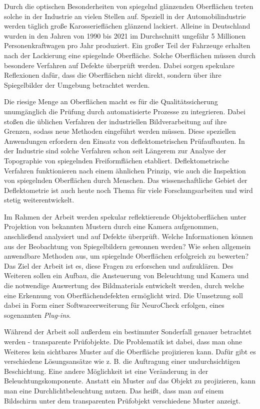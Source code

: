 Durch die optischen Besonderheiten von spiegelnd glänzenden Oberflächen treten solche in der Industrie an vielen Stellen auf.
Speziell in der Automobilindustrie werden täglich große Karosserieflächen glänzend lackiert.
Alleine in Deutschland wurden in den Jahren von 1990 bis 2021 im Durchschnitt ungefähr 5 Millionen Personenkraftwagen pro Jahr produziert. \cite{statistaPKW}
Ein großer Teil der Fahrzeuge erhalten nach der Lackierung eine spiegelnde Oberfläche.
Solche Oberflächen müssen durch besondere Verfahren auf Defekte überprüft werden.
Dabei sorgen spekulare Reflexionen dafür, dass die Oberflächen nicht direkt, sondern über ihre Spiegelbilder der Umgebung betrachtet werden. %

\p
Die riesige Menge an Oberflächen macht es für die Qualitätssicherung unumgänglich die Prüfung durch automatisierte Prozesse zu integrieren.
Dabei stoßen die üblichen Verfahren der industriellen Bildverarbeitung auf ihre Grenzen, sodass neue Methoden eingeführt werden müssen.
Diese speziellen Anwendungen erfordern den Einsatz von deflektometrischen Prüfaufbauten.
In der Industrie sind solche Verfahren schon seit Längerem zur Analyse der Topographie von spiegelnden Freiformflächen etabliert.
Deflektometrische Verfahren funktionieren nach einem ähnlichen Prinzip, wie auch die Inspektion von spiegelnden Oberflächen durch Menschen.
Das wissenschaftliche Gebiet der Deflektometrie ist auch heute noch Thema für viele Forschungsarbeiten und wird stetig weiterentwickelt.

\p
Im Rahmen der Arbeit werden spekular reflektierende Objektoberflächen unter Projektion von bekannten Mustern durch eine Kamera aufgenommen, anschließend analysiert und auf Defekte überprüft.
Welche Informationen können aus der Beobachtung von Spiegelbildern gewonnen werden?
Wie sehen allgemein anwendbare Methoden aus, um spiegelnde Oberflächen erfolgreich zu bewerten?
Das Ziel der Arbeit ist es, diese Fragen zu erforschen und aufzuklären.
Des Weiteren sollen ein Aufbau, die Ansteuerung von Beleuchtung und Kamera und die notwendige Auswertung des Bildmaterials entwickelt werden, durch welche eine Erkennung von Oberflächendefekten ermöglicht wird.
Die Umsetzung soll dabei in Form einer Softwareerweiterung für NeuroCheck erfolgen, eines sogenannten \textit{Plug-ins}.

\p
Während der Arbeit soll außerdem ein bestimmter Sonderfall genauer betrachtet werden - transparente Prüfobjekte.
Die Problematik ist dabei, dass man ohne Weiteres kein sichtbares Muster auf die Oberfläche projizieren kann.
Dafür gibt es verschiedene Lösungsansätze wie z. B. die Auftragung einer undurchsichtigen Beschichtung.
Eine andere Möglichkeit ist eine Veränderung in der Beleuchtungskomponente.
Anstatt ein Muster auf das Objekt zu projizieren, kann man eine Durchlichtbeleuchtung nutzen.
Das heißt, dass man auf einem Bildschirm unter dem transparenten Prüfobjekt verschiedene Muster anzeigt.

